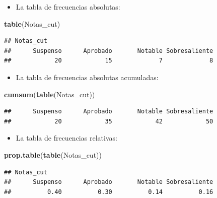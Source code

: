 \documentclass[]{book}
\newenvironment{Shaded}{\begin{snugshade}}{\end{snugshade}}
\newcommand{\KeywordTok}[1]{\textcolor[rgb]{0.13,0.29,0.53}{\textbf{#1}}}
\newcommand{\NormalTok}[1]{#1}
\providecommand{\tightlist}{%
  \setlength{\itemsep}{0pt}\setlength{\parskip}{0pt}}
\theoremstyle{definition}
\theoremstyle{definition}
\theoremstyle{definition}
\theoremstyle{remark}
\begin{document}
\begin{itemize}
\tightlist
\item
  La tabla de frecuencias absolutas:
\end{itemize}

\begin{Shaded}
\begin{Highlighting}[]
\KeywordTok{table}\NormalTok{(Notas_cut)  }
\end{Highlighting}
\end{Shaded}

\begin{verbatim}
## Notas_cut
##      Suspenso      Aprobado       Notable Sobresaliente 
##            20            15             7             8
\end{verbatim}

\begin{itemize}
\tightlist
\item
  La tabla de frecuencias absolutas acumuladas:
\end{itemize}

\begin{Shaded}
\begin{Highlighting}[]
\KeywordTok{cumsum}\NormalTok{(}\KeywordTok{table}\NormalTok{(Notas_cut))  }
\end{Highlighting}
\end{Shaded}

\begin{verbatim}
##      Suspenso      Aprobado       Notable Sobresaliente 
##            20            35            42            50
\end{verbatim}

\begin{itemize}
\tightlist
\item
  La tabla de frecuencias relativas:
\end{itemize}

\begin{Shaded}
\begin{Highlighting}[]
\KeywordTok{prop.table}\NormalTok{(}\KeywordTok{table}\NormalTok{(Notas_cut))   }
\end{Highlighting}
\end{Shaded}

\begin{verbatim}
## Notas_cut
##      Suspenso      Aprobado       Notable Sobresaliente 
##          0.40          0.30          0.14          0.16
\end{verbatim}
\end{document}
